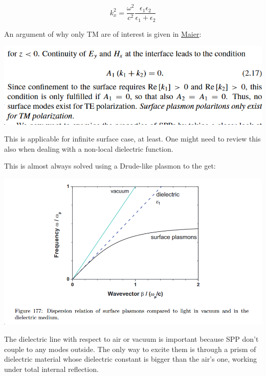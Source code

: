 \documentclass[11pt]{article}
\begin{document}
\begin{equation}
k_x^2 = \frac{\omega^2}{c^2 }  \frac{\epsilon_1 \epsilon_2}  {\epsilon_1+ \epsilon_2}
\end{equation}



An argument of why only TM are of interest is given in \href{./Maier\_PLASMONICS.pdf}{Maier}:
\begin{center}
\includegraphics[width=.9\linewidth]{./Surface_plasmon_polaritons_(SPP)/2023-08-21_20-03-10_screenshot.png}
\end{center}




This is applicable for infinite surface case, at least. One might need
to review this also when dealing with a non-local dielectric function.


This is almost always solved using a Drude-like plasmon to the get:


\begin{center}
\includegraphics[width=.9\linewidth]{./Surface_plasmon_polaritons_(SPP)/2023-08-22_16-25-56_screenshot.png}
\end{center}



The dielectric line with respect to air or vacuum is important
because SPP don't couple to any modes outside. The only way to excite
them is through a prism of dielectric material whose dielectric
constant is bigger than the air's one, working under total internal
reflection. 
\end{document}
